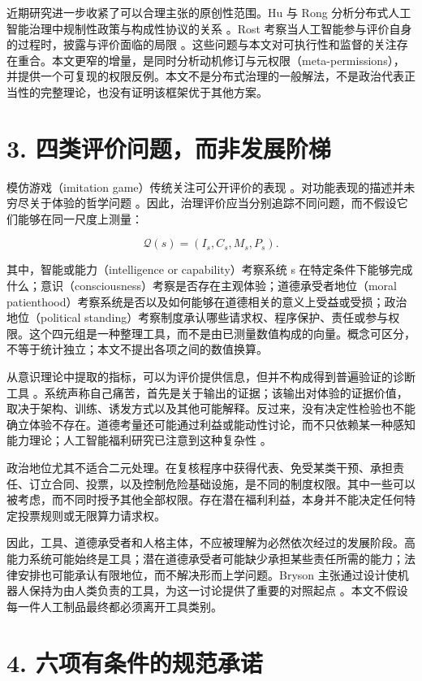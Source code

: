 \documentclass[11pt,a4paper,fontset=fandol]{ctexart}
\begin{document}
近期研究进一步收紧了可以合理主张的原创性范围。Hu 与 Rong 分析分布式人工智能治理中规制性政策与构成性协议的关系 \cite{ref-21}。Rost 考察当人工智能参与评价自身的过程时，披露与评价面临的局限 \cite{ref-22}。这些问题与本文对可执行性和监督的关注存在重合。本文更窄的增量，是同时分析动机修订与元权限（meta-permissions），并提供一个可复现的权限反例。本文不是分布式治理的一般解法，不是政治代表正当性的完整理论，也没有证明该框架优于其他方案。

\hypertarget{section-4}{%
\section{3. 四类评价问题，而非发展阶梯}\label{section-4}}

模仿游戏（imitation game）传统关注可公开评价的表现 \cite{ref-17}。对功能表现的描述并未穷尽关于体验的哲学问题 \cite{ref-18}。因此，治理评价应当分别追踪不同问题，而不假设它们能够在同一尺度上测量：

\[
\mathcal{Q}(s)=(I_s,C_s,M_s,P_s).
\]

其中，智能或能力（intelligence or capability）考察系统 s 在特定条件下能够完成什么；意识（consciousness）考察是否存在主观体验；道德承受者地位（moral patienthood）考察系统是否以及如何能够在道德相关的意义上受益或受损；政治地位（political standing）考察制度承认哪些请求权、程序保护、责任或参与权限。这个四元组是一种整理工具，而不是由已测量数值构成的向量。概念可区分，不等于统计独立；本文不提出各项之间的数值换算。

从意识理论中提取的指标，可以为评价提供信息，但并不构成得到普遍验证的诊断工具 \cite{ref-2}。系统声称自己痛苦，首先是关于输出的证据；该输出对体验的证据价值，取决于架构、训练、诱发方式以及其他可能解释。反过来，没有决定性检验也不能确立体验不存在。道德考量还可能通过利益或能动性讨论，而不只依赖某一种感知能力理论；人工智能福利研究已注意到这种复杂性 \cite{ref-3}。

政治地位尤其不适合二元处理。在复核程序中获得代表、免受某类干预、承担责任、订立合同、投票，以及控制危险基础设施，是不同的制度权限。其中一些可以被考虑，而不同时授予其他全部权限。存在潜在福利利益，本身并不能决定任何特定投票规则或无限算力请求权。

因此，工具、道德承受者和人格主体，不应被理解为必然依次经过的发展阶段。高能力系统可能始终是工具；潜在道德承受者可能缺少承担某些责任所需的能力；法律安排也可能承认有限地位，而不解决形而上学问题。Bryson 主张通过设计使机器人保持为由人类负责的工具，为这一讨论提供了重要的对照起点 \cite{ref-12}。本文不假设每一件人工制品最终都必须离开工具类别。

\hypertarget{section-5}{%
\section{4. 六项有条件的规范承诺}\label{section-5}}
\end{document}
